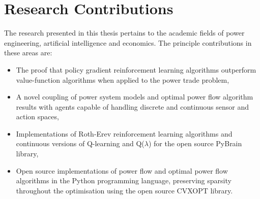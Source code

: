 

\section{Research Contributions}
The research presented in this thesis pertains to the academic fields of power
engineering, artificial intelligence and economics.  The principle
contributions in these areas are:

\begin{itemize}
  \item The proof that policy gradient reinforcement learning algorithms
  outperform value-function algorithms when applied to the power trade problem,
  \item A novel coupling of power system models and optimal power flow
  algorithm results with agents capable of handling discrete and continuous
  sensor and action spaces,
  \item Implementations of Roth-Erev reinforcement learning algorithms and
  continuous versions of Q-learning and Q($\lambda$) for the open source
  PyBrain library,
  \item Open source implementations of power flow and optimal power flow
  algorithms in the Python programming language, preserving sparsity throughout
  the optimisation using the open source CVXOPT library.
\end{itemize}

